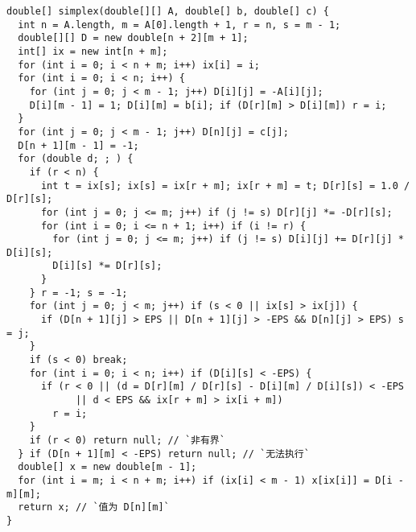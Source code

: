 \begin{lstlisting}
double[] simplex(double[][] A, double[] b, double[] c) {
  int n = A.length, m = A[0].length + 1, r = n, s = m - 1;
  double[][] D = new double[n + 2][m + 1];
  int[] ix = new int[n + m];
  for (int i = 0; i < n + m; i++) ix[i] = i;
  for (int i = 0; i < n; i++) {
    for (int j = 0; j < m - 1; j++) D[i][j] = -A[i][j];
    D[i][m - 1] = 1; D[i][m] = b[i]; if (D[r][m] > D[i][m]) r = i;
  }
  for (int j = 0; j < m - 1; j++) D[n][j] = c[j];
  D[n + 1][m - 1] = -1;
  for (double d; ; ) {
    if (r < n) {
      int t = ix[s]; ix[s] = ix[r + m]; ix[r + m] = t; D[r][s] = 1.0 / D[r][s];
      for (int j = 0; j <= m; j++) if (j != s) D[r][j] *= -D[r][s];
      for (int i = 0; i <= n + 1; i++) if (i != r) {
        for (int j = 0; j <= m; j++) if (j != s) D[i][j] += D[r][j] * D[i][s];
        D[i][s] *= D[r][s];
      }
    } r = -1; s = -1;
    for (int j = 0; j < m; j++) if (s < 0 || ix[s] > ix[j]) {
      if (D[n + 1][j] > EPS || D[n + 1][j] > -EPS && D[n][j] > EPS) s = j;
    }
    if (s < 0) break;
    for (int i = 0; i < n; i++) if (D[i][s] < -EPS) {
      if (r < 0 || (d = D[r][m] / D[r][s] - D[i][m] / D[i][s]) < -EPS
            || d < EPS && ix[r + m] > ix[i + m])
        r = i;
    }
    if (r < 0) return null; // `非有界`
  } if (D[n + 1][m] < -EPS) return null; // `无法执行`
  double[] x = new double[m - 1];
  for (int i = m; i < n + m; i++) if (ix[i] < m - 1) x[ix[i]] = D[i - m][m];
  return x; // `值为 D[n][m]`
}
\end{lstlisting}